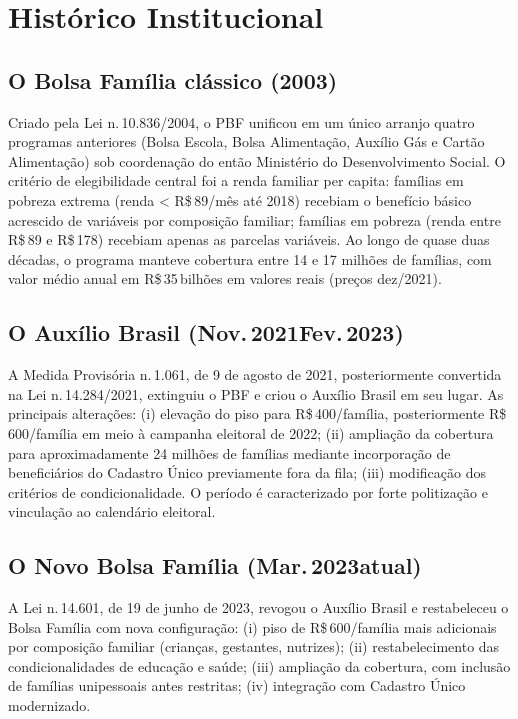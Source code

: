 \documentclass[12pt,a4paper,oneside]{article}
\newcommand{\rs}{R\$\,}
\begin{document}
\section{Histórico Institucional}\label{sec:teoria}

\subsection{O Bolsa Família clássico (2003)}

Criado pela Lei n.\,10.836/2004, o PBF unificou em um único arranjo
quatro programas anteriores (Bolsa Escola, Bolsa Alimentação,
Auxílio Gás e Cartão Alimentação) sob coordenação do então
Ministério do Desenvolvimento Social. O critério de elegibilidade
central foi a renda familiar per capita: famílias em pobreza
extrema (renda < \rs 89/mês até 2018) recebiam o benefício básico
acrescido de variáveis por composição familiar; famílias em pobreza
(renda entre \rs 89 e \rs 178) recebiam apenas as parcelas
variáveis. Ao longo de quase duas décadas, o programa manteve
cobertura entre 14 e 17 milhões de famílias, com valor médio anual
em \rs 35\,bilhões em valores reais (preços
dez/2021).

\subsection{O Auxílio Brasil (Nov.\,2021\textendash Fev.\,2023)}

A Medida Provisória n.\,1.061, de 9 de agosto de 2021,
posteriormente convertida na Lei n.\,14.284/2021, extinguiu o PBF e
criou o Auxílio Brasil em seu lugar. As principais alterações:
(i) elevação do piso para \rs 400/família, posteriormente
\rs 600/família em meio à campanha eleitoral de 2022;
(ii) ampliação da cobertura para aproximadamente 24 milhões de
famílias mediante incorporação de beneficiários do Cadastro Único
previamente fora da fila; (iii) modificação dos critérios de
condicionalidade. O período é caracterizado por forte politização e
vinculação ao calendário eleitoral.

\subsection{O Novo Bolsa Família (Mar.\,2023\textendash atual)}

A Lei n.\,14.601, de 19 de junho de 2023, revogou o Auxílio Brasil e
restabeleceu o Bolsa Família com nova configuração: (i) piso de
\rs 600/família mais adicionais por composição familiar (crianças,
gestantes, nutrizes); (ii) restabelecimento das condicionalidades
de educação e saúde; (iii) ampliação da cobertura, com inclusão de
famílias unipessoais antes restritas; (iv) integração com
Cadastro Único modernizado.
\end{document}
